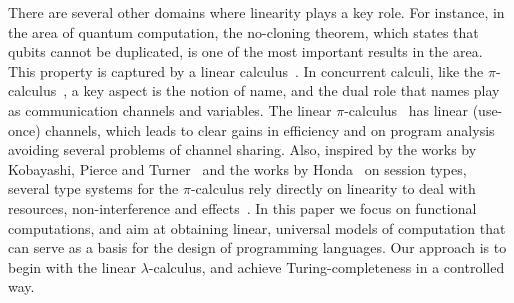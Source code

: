 \documentclass{article}
\begin{document}
There are several other domains where linearity plays a key role.  For
instance, in the area of quantum computation, the no-cloning theorem,
which states that qubits cannot be duplicated, is one of the most
important results in the area. This property is captured by a linear
calculus~\cite{Tonder2004}. In concurrent calculi, like the
$\pi$-calculus~\cite{Milner1992}, a key aspect is the notion of name,
and the dual role that names play as communication channels and
variables. The linear $\pi$-calculus~\cite{KobayashiPT96} has linear
(use-once) channels, which leads to clear gains in efficiency and on
program analysis avoiding several problems of channel sharing. Also,
inspired by the works by Kobayashi, Pierce and
Turner~\cite{KobayashiPT96} and the works by Honda~\cite{Honda93} on
session types, several type systems for the $\pi$-calculus rely
directly on linearity to deal with resources, non-interference and
effects~\cite{GiuntiV10,YoshidaHB02}.  In this paper we focus on
functional computations, and aim at obtaining linear, universal models
of computation that can serve as a basis for the design of programming
languages. Our approach is to begin with the linear
$\lambda$-calculus, and achieve Turing-completeness in a controlled
way.  
\end{document}
